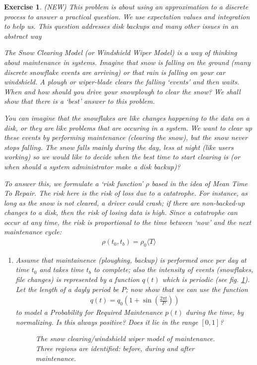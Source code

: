 \documentclass{book}
\newtheorem{exercise}{Exercise}
\def\beq{\begin{eqnarray}}
\def\eeq{\end{eqnarray}}
\begin{document}
\begin{exercise}
(NEW) This problem is about using an approximation to a discrete
process to answer a practical question. We use expectation values and
integration to help us. This question addresses disk backups and many
other issues in an abstract way

The Snow Clearing Model (or Windshield Wiper Model) is a way of
thinking about maintenance in systems. Imagine that snow is falling on
the ground (many discrete snowflake events are arriving) or that rain
is falling on your car windshield. A plough or wiper-blade clears the
falling `events' and then waits. When and how should you drive your
snowplough to clear the snow? We shall show that there is a `best' answer
to this problem.

You can imagine that the snowflakes are like changes happening to the
data on a disk, or they are like problems that are occuring in a
system. We want to clear up these events by performing maintenance
(clearing the snow), but the snow never stops falling. The snow falls
mainly during the day, less at night (like users working) so we would
like to decide when the best time to start clearing is (or when should a
system administrator make a disk backup)?

To answer this, we formulate a `risk function' $\rho$ based in the idea of
Mean Time To Repair. The risk here is the risk of loss due to a
catatrophe. For instance, as long as the snow is not cleared, a driver
could crash; if there are non-backed-up changes to a disk, then the
risk of losing data is high.  Since a catatrophe can occur at any
time, the risk is proportional to the time between `now' and the next
maintenance cycle:
\beq
\rho(t_0,t_b) = \rho_0 \langle T \rangle
\eeq

\begin{enumerate}
\item Assume that maintainence (ploughing, backup) is performed once per day at time
$t_0$ and takes time $t_b$ to complete; also the intensity of events
(snowflakes, file changes) is represented by a function $q(t)$ which
is periodic (see fig. \ref{wind}). Let the length of a dayly period be $P$;
now show that we can use the function
\beq
q(t) = q_0 \left( 1 +\sin\left(\frac{2\pi t}{P}\right)\right)
\eeq
to model a Probability for Required Maintenance $p(t)$ during the
time, by normalizing. Is this always positive? Does it lie in the
range $[0,1]$?



\begin{figure}[ht]
\begin{center}
\caption{The snow clearing/windshield wiper model of maintenance. Three regions
are identified: before, during and after maintenance.\label{wind}}
\end{center}
\end{figure}


\end{enumerate}
\end{exercise}
\end{document}
